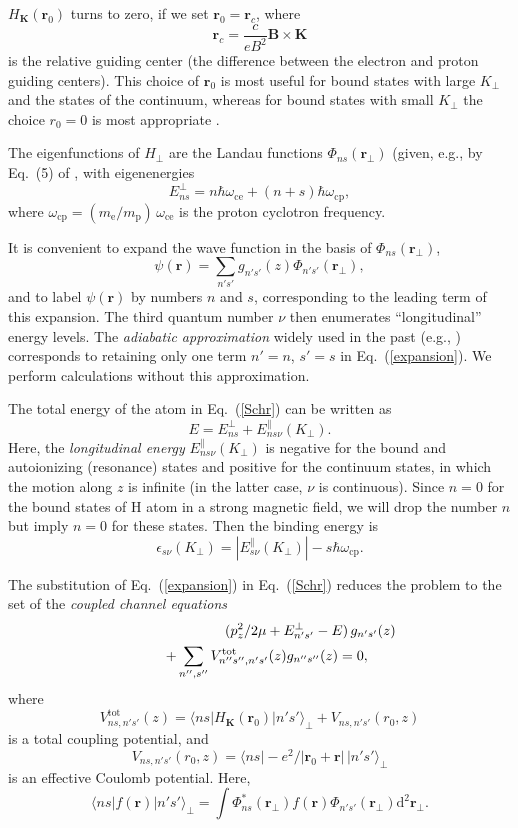 \documentclass{emulateapj}
\newcommand{\beq}{\begin{equation}}
\newcommand{\eeq}{\end{equation}}
\newcommand{\bea}{\begin{eqnarray}}
\newcommand{\eea}{\end{eqnarray}}
\newcommand{\req}[1]{Eq.\ (\ref{#1})}
\newcommand{\mel}{m_\mathrm{e}}
\newcommand{\mpr}{m_\mathrm{p}}
\newcommand{\dd}{\mathrm{d}}
\newcommand{\omc}{\omega_\mathrm{ce}}
\newcommand{\omp}{\omega_\mathrm{cp}}
\begin{document}
 $H_{\bm{K}}(\bm{r}_0)$ turns to zero,
if we set $\bm{r}_0=\bm{r}_c$, where
\beq
   \bm{r}_c = \frac{c}{eB^2}\bm{B}\times\bm{K}
\eeq
is the relative guiding center (the difference
between the electron and proton guiding centers).
This choice of $\bm{r}_0$ is most useful for bound states
with large $K_\perp$ and the states of the continuum, whereas 
for bound states with small $K_\perp$ the choice $r_0=0$
is most appropriate \citep{P94,PP97}.

The eigenfunctions of $H_\perp$ 
are the Landau functions
$\Phi_{{n}s}(\bm{r}_\perp)$ (given, e.g., 
by Eq.\ (5) of \citet{PP93},
with eigenenergies 
\beq
   E_{{n}s}^\perp = {n}\hbar\omc 
   + ({n}+s) \hbar\omp ,
\eeq
where $\omp =(\mel/\mpr)\,\omc$
is the proton cyclotron frequency. 

It is convenient
to expand the wave function in the basis of $\Phi_{{n}s}(\bm{r}_\perp)$,
\beq
   \psi(\bm{r}) =  \sum_{{n}'s'} g_{{n}'s'}(z)
                        \Phi_{{n}'s'}(\bm{r}_\perp),
\label{expansion}
\eeq
and to label $\psi(\bm{r})$ by numbers ${n}$ and $s$, corresponding to
the leading term of this expansion.
The third quantum number $\nu$ then enumerates
``longitudinal'' energy levels.
The \emph{adiabatic approximation} widely used in the past
(e.g., \citealp{GD,CanutoVentura})
corresponds to retaining only one term $n'=n$, $s'=s$ in \req{expansion}.
We perform calculations without this approximation.

The total energy of the atom in \req{Schr} can be written as
\beq
   E= E_{{n}s}^\perp + E^\|_{{n}s\nu}(K_\perp).
\eeq
Here, the \emph{longitudinal energy} $E^\|_{{n}s\nu}(K_\perp)$ 
is negative for the bound and autoionizing (resonance) states
and positive for the continuum states, in which the motion
along $z$ is infinite (in the latter case, $\nu$ is continuous).
Since $n=0$ for the bound states of H atom in a strong magnetic field,
we will drop the number ${n}$ but imply $n=0$ for these states.
Then the binding energy is
\beq
   \epsilon_{s\nu}(K_\perp)=|E_{s\nu}^\|(K_\perp)|
       - s \hbar\omp .
\label{chi}
\eeq

The substitution of \req{expansion} in \req{Schr} reduces the problem
to the set of the \emph{coupled channel equations}
\bea&&
   (p_z^2/2\mu+E_{{n}'s'}^\perp - E)\, g_{{n}'s'}(z)
  \nonumber\\&&\hspace*{2em}
   + \sum_{{n}'',s''} V_{{n}''s'',{n}'s'}^{\mathrm{tot}}(z) g_{{n}''s''}(z)
   =0 ,
\hspace*{2em}\label{system}
\eea
where 
\beq
V_{{n}s,{n}'s'}^{\mathrm{tot}}(z)=
\langle {n}s|H_{\bm{K}}(\bm{r}_0)|{n}'s'\rangle_\perp + V_{{n}s,{n}'s'}(r_0,z)
\eeq 
is a total coupling potential, and
\beq
   V_{{n}s,{n}'s'}(r_0,z) = 
   \big\langle {n}s \big| -e^2/|\bm{r}_0+\bm{r}|\,\big|{n}'s' \big\rangle_\perp
\label{V}
\eeq
is an effective Coulomb potential.
Here, 
\beq
\langle {n}s|f(\bm{r})|{n}'s'\rangle_\perp
   = \int \Phi_{{n}s}^\ast(\bm{r}_\perp)  f(\bm{r})
    \Phi_{{n}'s'}(\bm{r}_\perp) \dd^2\bm{r}_\perp.
 \eeq
\end{document}

